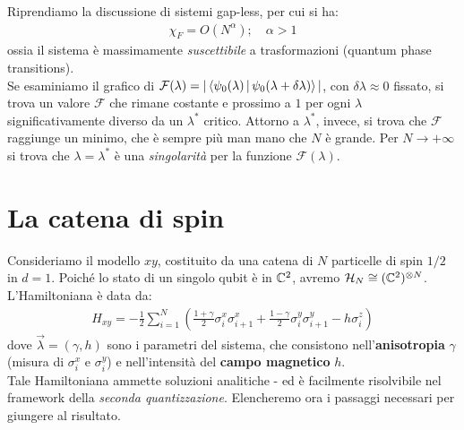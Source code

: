 \documentclass[../../InformazioneQuantistica.tex]{subfiles}
\begin{document}
Riprendiamo la discussione di sistemi gap-less, per cui si ha:
\begin{align*}
\chi_F = O(N^\alpha); \quad \alpha > 1
\end{align*}
ossia il sistema è massimamente \textit{suscettibile} a trasformazioni (quantum phase transitions).\\
Se esaminiamo il grafico di $\mathcal{F}(\lambda) = |\Braket{\psi_0(\lambda)|\psi_0(\lambda+\delta \lambda)}|$, con $\delta\lambda \approx 0$ fissato, si trova un valore $\mathcal{F}$ che rimane costante e prossimo a $1$ per ogni $\lambda$ significativamente diverso da un $\lambda^*$ critico. Attorno a $\lambda^*$, invece, si trova che $\mathcal{F}$ raggiunge un minimo, che è sempre più  man mano che $N$ è grande. Per $N\to +\infty$ si trova che $\lambda=\lambda^*$ è una \textit{singolarità} per la funzione $\mathcal{F}(\lambda)$.

\section{La catena di spin}
Consideriamo il modello $xy$, costituito da una catena di $N$ particelle di spin $1/2$ in $d=1$. Poiché lo stato di un singolo qubit è in $\mathbb{C}^2$, avremo $\mathcal{H}_N \cong (\mathbb{C}^2)^{\otimes N}$.\\
L'Hamiltoniana è data da:
\begin{align*}
H_{xy} = -\frac{1}{2}\sum_{i=1}^N \left(\frac{1+\gamma}{2}\sigma_i^x \sigma_{i+1}^x + \frac{1-\gamma}{2}\sigma_i^y \sigma_{i+1}^y - h\sigma_i^z \right)
\end{align*}
dove $\vec{\lambda} = (\gamma, h)$ sono i parametri del sistema, che consistono nell'\textbf{anisotropia} $\gamma$ (misura  di $\sigma_i^x$ e $\sigma_i^y$) e nell'intensità del \textbf{campo magnetico} $h$.\\

Tale Hamiltoniana ammette soluzioni analitiche - ed è facilmente risolvibile nel framework della \textit{seconda quantizzazione}. Elencheremo ora i passaggi necessari per giungere al risultato.\\
\end{document}
